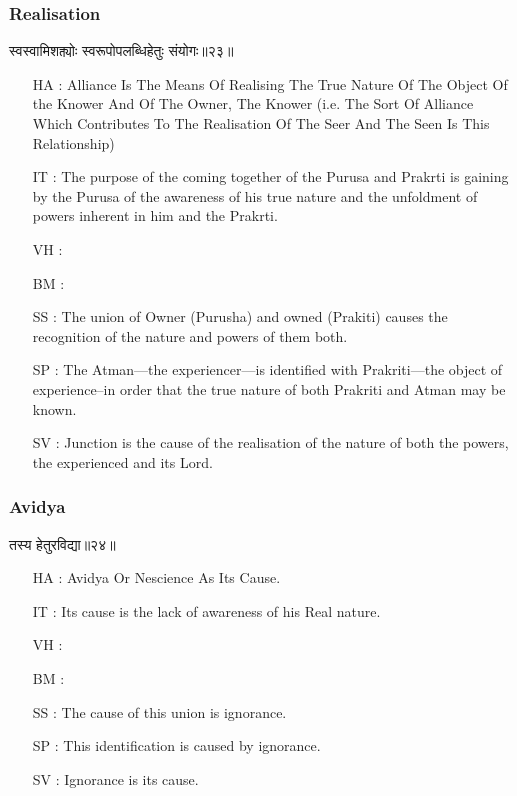 \begin{frame}[fragile]\frametitle{Realisation}
\begin{sanskrit}
स्वस्वामिशक्त्योः स्वरूपोपलब्धिहेतुः संयोगः॥२३॥
\end{sanskrit}

	\begin{itemize}
	\item [HA]: Alliance Is The Means Of Realising The True Nature Of The Object Of the Knower And Of The Owner, The Knower (i.e. The Sort Of Alliance Which Contributes To The Realisation Of The Seer And The Seen Is This Relationship)
	\item [IT]: The purpose of the coming together of the Purusa and Prakrti is gaining by the Purusa of the awareness of his true nature and the unfoldment of powers inherent in him and the Prakrti.
	\item [VH]: 
	\item [BM]: 
	\item [SS]: The union of Owner (Purusha) and owned (Prakiti) causes the recognition of the nature and powers of them both.
	\item [SP]: The Atman—the experiencer—is identified with Prakriti—the object of experience–in order that the true nature of both Prakriti and Atman may be known.
	\item [SV]: Junction is the cause of the realisation of the nature of both the powers, the experienced and its Lord. 
	\end{itemize}
\end{frame}

\begin{frame}[fragile]\frametitle{Avidya}
\begin{sanskrit}
तस्य हेतुरविद्या॥२४॥
\end{sanskrit}

	\begin{itemize}
	\item [HA]: Avidya Or Nescience As Its Cause.
	\item [IT]: Its cause is the lack of awareness of his Real nature.
	\item [VH]: 
	\item [BM]: 
	\item [SS]: The cause of this union is ignorance.
	\item [SP]: This identification is caused by ignorance.
	\item [SV]: Ignorance is its cause. 
	\end{itemize}
\end{frame}

